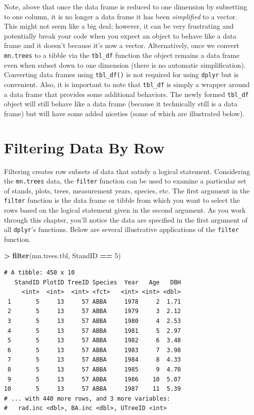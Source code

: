 \documentclass[]{krantz}
\makeatletter
\newenvironment{Shaded}{\begin{snugshade}}{\end{snugshade}}
\newcommand{\DecValTok}[1]{\textcolor[rgb]{0.06,0.06,0.06}{#1}}
\newcommand{\KeywordTok}[1]{\textcolor[rgb]{0.27,0.27,0.27}{\textbf{#1}}}
\newcommand{\NormalTok}[1]{#1}
\newcommand{\OperatorTok}[1]{\textcolor[rgb]{0.43,0.43,0.43}{\textbf{#1}}}
\newcommand{\StringTok}[1]{\textcolor[rgb]{0.5,0.5,0.5}{#1}}
\newenvironment{kframe}{%
\medskip{}
\setlength{\fboxsep}{.8em}
 \def\at@end@of@kframe{}%
 \ifinner\ifhmode%
  \def\at@end@of@kframe{\end{minipage}}%
  \begin{minipage}{\columnwidth}%
 \fi\fi%
 \def\FrameCommand##1{\hskip\@totalleftmargin \hskip-\fboxsep
 \colorbox{shadecolor}{##1}\hskip-\fboxsep
     \hskip-\linewidth \hskip-\@totalleftmargin \hskip\columnwidth}%
 \MakeFramed {\advance\hsize-\width
   \@totalleftmargin\z@ \linewidth\hsize
   \@setminipage}}%
 {\par\unskip\endMakeFramed%
 \at@end@of@kframe}
\renewenvironment{Shaded}{\begin{kframe}}{\end{kframe}}
\makeatother
\begin{document}
Note, above that once the data frame is reduced to one dimension by subsetting to one column, it is no longer a data frame it has been \emph{simplified} to a vector. This might not seem like a big deal; however, it can be very frustrating and potentially break your code when you expect an object to behave like a data frame and it doesn't because it's now a vector. Alternatively, once we convert \texttt{mn.trees} to a tibble via the \texttt{tbl\_df} function the object remains a data frame even when subset down to one dimension (there is no automatic simplification). Converting data frames using \texttt{tbl\_df()} is not required for using \texttt{dplyr} but is convenient. Also, it is important to note that \texttt{tbl\_df} is simply a wrapper around a data frame that provides some additional behaviors. The newly formed \texttt{tbl\_df} object will still behave like a data frame (because it technically still is a data frame) but will have some added niceties (some of which are illustrated below).

\hypertarget{filtering-data-by-row}{%
\section{Filtering Data By Row}\label{filtering-data-by-row}}

Filtering creates row subsets of data that satisfy a logical statement. Considering the \texttt{mn.trees} data, the \texttt{filter} function can be used to examine a particular set of stands, plots, trees, measurement years, species, etc. The first argument in the \texttt{filter} function is the data frame or tibble from which you want to select the rows based on the logical statement given in the second argument. As you work through this chapter, you'll notice the data are specified in the first argument of all \texttt{dplyr}'s functions. Below are several illustrative applications of the \texttt{filter} function.

\begin{Shaded}
\begin{Highlighting}[]
\OperatorTok{>}\StringTok{ }\KeywordTok{filter}\NormalTok{(mn.trees.tbl, StandID }\OperatorTok{==}\StringTok{ }\DecValTok{5}\NormalTok{)}
\end{Highlighting}
\end{Shaded}

\begin{verbatim}
# A tibble: 450 x 10
   StandID PlotID TreeID Species  Year   Age   DBH
     <int>  <int>  <int> <fct>   <int> <int> <dbl>
 1       5     13     57 ABBA     1978     2  1.71
 2       5     13     57 ABBA     1979     3  2.12
 3       5     13     57 ABBA     1980     4  2.53
 4       5     13     57 ABBA     1981     5  2.97
 5       5     13     57 ABBA     1982     6  3.48
 6       5     13     57 ABBA     1983     7  3.98
 7       5     13     57 ABBA     1984     8  4.33
 8       5     13     57 ABBA     1985     9  4.70
 9       5     13     57 ABBA     1986    10  5.07
10       5     13     57 ABBA     1987    11  5.39
# ... with 440 more rows, and 3 more variables:
#   rad.inc <dbl>, BA.inc <dbl>, UTreeID <int>
\end{verbatim}
\end{document}
